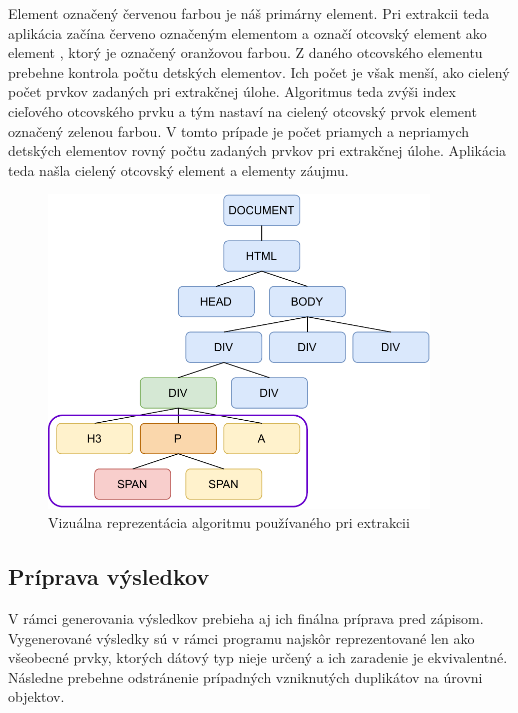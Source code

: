 Element  označený červenou farbou je náš primárny element. Pri extrakcii teda aplikácia začína červeno označeným elementom  a označí otcovský element ako element , ktorý je označený oranžovou farbou. Z daného otcovského elementu prebehne kontrola počtu detských elementov. Ich počet je však menší, ako cielený počet prvkov zadaných pri extrakčnej úlohe. Algoritmus teda zvýši index cieľového otcovského prvku a tým nastaví na cielený otcovský prvok element  označený zelenou farbou. V tomto prípade je počet priamych a nepriamych detských elementov rovný počtu zadaných prvkov pri extrakčnej úlohe. Aplikácia teda našla cielený otcovský element a elementy záujmu.

\bigskip

 \begin{figure}[hbt]
	\centering
	\includegraphics[width=0.9\textwidth]{obrazky-figures/dom.pdf}
	\caption{Vizuálna reprezentácia algoritmu používaného pri extrakcii}
	\label{domvisual}
\end{figure}

\newpage

\subsection{Príprava výsledkov}

V rámci generovania výsledkov prebieha aj ich finálna príprava pred zápisom. Vygenerované výsledky sú v rámci programu najskôr reprezentované len ako všeobecné prvky, ktorých dátový typ nieje určený a ich zaradenie je ekvivalentné. Následne prebehne odstránenie prípadných vzniknutých duplikátov na úrovni objektov. 

